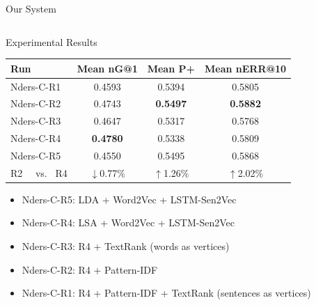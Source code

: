 \documentclass[final,hyperref={pdfpagelabels=false}]{beamer}
\begin{document}
\begin{frame}{}
\begin{block}{\large Our System}
    \end{block}
    \begin{columns}[t]
      \begin{column}{.49\linewidth}
        \begin{block}{Experimental Results}
          \begin{table}
          \centering
          \setlength\tabcolsep{1cm}
          \begin{tabular}{lccc}
          \hline
           Run        &  Mean nG@1  &  Mean P+  &  Mean nERR@10  \\ \hline
           Nders-C-R1 & 0.4593 & 0.5394 & 0.5805 \\ %
           Nders-C-R2 & 0.4743 & \textbf{0.5497} & \textbf{0.5882} \\ %
           Nders-C-R3 & 0.4647 & 0.5317 & 0.5768 \\ %
           Nders-C-R4 & \textbf{0.4780} & 0.5338 & 0.5809 \\ %
           Nders-C-R5 & 0.4550 & 0.5495 & 0.5868 \\ \hline
           R2 \ \ vs. \  R4  & $\downarrow$0.77\% & $\uparrow$1.26\% & $\uparrow$2.02\% \\ \hline

          \end{tabular}
          \end{table}
          \begin{itemize}
            \item{Nders-C-R5: } LDA + Word2Vec + LSTM-Sen2Vec 
            \item{Nders-C-R4: } LSA + Word2Vec + LSTM-Sen2Vec 
            \item{Nders-C-R3: } R4 + TextRank (words as vertices) 
            \item{Nders-C-R2: } R4 + Pattern-IDF
            \item{Nders-C-R1: } R4 + Pattern-IDF + TextRank (sentences as vertices)
          \end{itemize}
        \end{block}
      \end{column}
\end{columns}
\end{frame}
\end{document}
